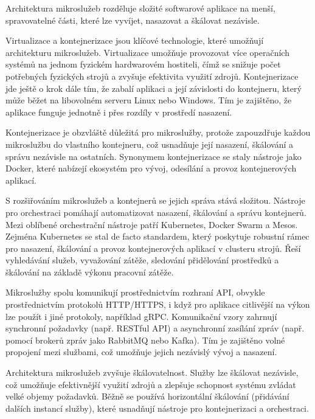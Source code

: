 
Architektura mikroslužeb rozděluje složité softwarové aplikace na menší, spravovatelné části, které lze vyvíjet, nasazovat a škálovat nezávisle.


Virtualizace a kontejnerizace jsou klíčové technologie, které umožňují architekturu mikroslužeb. Virtualizace umožňuje provozovat více operačních systémů na jednom fyzickém hardwarovém hostiteli, čímž se snižuje počet potřebných fyzických strojů a zvyšuje efektivita využití zdrojů. Kontejnerizace jde ještě o krok dále tím, že zabalí aplikaci a její závislosti do kontejneru, který může běžet na libovolném serveru Linux nebo Windows. Tím je zajištěno, že aplikace funguje jednotně i přes rozdíly v prostředí nasazení.

Kontejnerizace je obzvláště důležitá pro mikroslužby, protože zapouzdřuje každou mikroslužbu do vlastního kontejneru, což usnadňuje její nasazení, škálování a správu nezávisle na ostatních. Synonymem kontejnerizace se staly nástroje jako Docker, které nabízejí ekosystém pro vývoj, odesílání a provoz kontejnerových aplikací.


S rozšiřováním mikroslužeb a kontejnerů se jejich správa stává složitou. Nástroje pro orchestraci pomáhají automatizovat nasazení, škálování a správu kontejnerů. Mezi oblíbené orchestrační nástroje patří Kubernetes, Docker Swarm a Mesos. Zejména Kubernetes se stal de facto standardem, který poskytuje robustní rámec pro nasazení, škálování a provoz kontejnerových aplikací v clusteru strojů. Řeší vyhledávání služeb, vyvažování zátěže, sledování přidělování prostředků a škálování na základě výkonu pracovní zátěže.



Mikroslužby spolu komunikují prostřednictvím rozhraní API, obvykle prostřednictvím protokolů HTTP/HTTPS, i když pro aplikace citlivější na výkon lze použít i jiné protokoly, například gRPC. Komunikační vzory zahrnují synchronní požadavky (např. RESTful API) a asynchronní zasílání zpráv (např. pomocí brokerů zpráv jako RabbitMQ nebo Kafka). Tím je zajištěno volné propojení mezi službami, což umožňuje jejich nezávislý vývoj a nasazení.


Architektura mikroslužeb zvyšuje škálovatelnost. Služby lze škálovat nezávisle, což umožňuje efektivnější využití zdrojů a zlepšuje schopnost systému zvládat velké objemy požadavků. Běžně se používá horizontální škálování (přidávání dalších instancí služby), které usnadňují nástroje pro kontejnerizaci a orchestraci.

